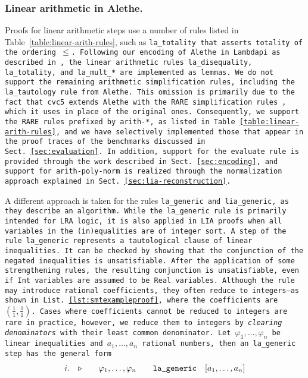 \subsubsection{Linear arithmetic in Alethe.}
\label{sssect:la-in-alethe}

Proofs for linear arithmetic steps use a number of rules listed in Table~\ref{table:linear-arith-rules}, such as \tt{la\_totality} that asserts totality of the ordering $\leq$. 
Following our encoding of Alethe in Lambdapi as described in \cite{ColtellacciMD24}, the linear arithmetic rules \tt{la\_disequality}, \tt{la\_totality}, and \tt{la\_mult\_*} are implemented as lemmas.
We do not support the remaining arithmetic simplification rules, including the \tt{la\_tautology} rule from Alethe.
This omission is primarily due to the fact that cvc5 extends Alethe with the RARE simplification rules \cite{rare}, which it uses in place of the original ones.
Consequently, we support the RARE rules prefixed by \tt{arith-*}, as listed in Table~\ref{table:linear-arith-rules}, and we have selectively implemented those that appear in the proof traces of the benchmarks discussed in Sect.~\ref{sec:evaluation}.
In addition, support for the \tt{evaluate} rule is provided through the work described in Sect.~\ref{sec:encoding}, and support for \tt{arith-poly-norm} is realized through the normalization approach explained in Sect.~\ref{sec:lia-reconstruction}.

A different approach is taken for the rules \tt{la\_generic} and \tt{lia\_generic}, as they describe an algorithm.
While the \tt{la\_generic rule} is primarily intended for LRA logic, it is also applied in LIA proofs when all variables in the (in)equalities are of integer sort.
A step of the rule \tt{la\_generic} represents a tautological clause of linear inequalities.  It can be checked by showing that the conjunction of
the negated inequalities is unsatisfiable. After the application of some strengthening rules, the resulting conjunction is unsatisfiable,
even if \lstinline[language=SMT,basicstyle=\ttfamily\footnotesize\upshape]{Int} variables are assumed to be \lstinline[language=SMT,basicstyle=\ttfamily\footnotesize\upshape]{Real} variables.
Although the rule may introduce rational coefficients, they often reduce to integers—as shown in List.~\ref{lst:smtexampleproof}, where the coefficients are $(\frac{1}{1}, \frac{1}{1})$.
Cases where coefficients cannot be reduced to integers are rare in practice, however, we reduce them to integers by \emph{clearing denominators} with their least common denominator.
Let $\varphi_1,\dots, \varphi_n$ be linear inequalities  and $a_1, \dots, a_n$ rational numbers, then an \tt{la\_generic} step has the general form
%
\[
\begin{matrix*}[c]
  i. & \ctxsep \quad & \varphi_1 , \dots , \varphi_n & \quad \tt{la\_generic}  & [a_1, \dots, a_n] \\
\end{matrix*}
\]

